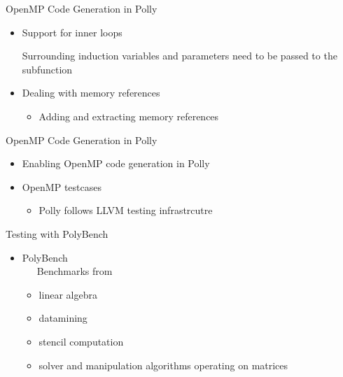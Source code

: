 \documentclass{beamer}
\begin{document}
\begin{frame}{OpenMP Code Generation in Polly}
\begin{itemize}
\item Support for inner loops

\begin{block}{ }
{\footnotesize}
\end{block}
Surrounding induction variables and parameters need to be passed to the subfunction
\pause
\item Dealing with memory references
\begin{block}{ }
{\footnotesize}
\end{block}
	\begin{itemize}
	\item Adding and extracting memory references
	\end{itemize}
\end{itemize}
\end{frame}


\begin{frame}{OpenMP Code Generation in Polly}
\begin{itemize}
\item Enabling OpenMP code generation in Polly
\begin{block}{ }
{\tiny}
\end{block}
\item OpenMP testcases
	\begin{itemize}
	\item Polly follows LLVM testing infrastrcutre
	\end{itemize}
\end{itemize}
\end{frame}

\begin{frame}{Testing with PolyBench}
\begin{itemize}
\item PolyBench \\
	\ \ \ Benchmarks from
	\begin{itemize}
	\item linear algebra
	\item datamining
	\item stencil computation
	\item solver and manipulation algorithms operating on matrices
	\end{itemize}
\end{itemize}
\end{frame}
\end{document}
